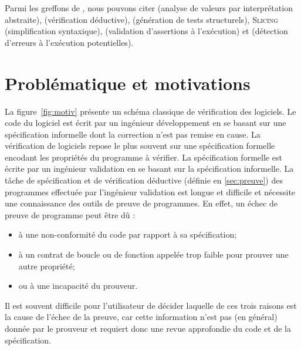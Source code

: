 Parmi les greffons de \framac, nous pouvons citer \Value (analyse de valeurs par
interprétation abstraite), \Wp (vérification déductive), \pathcrawler
(génération de tests structurels), \textsc{Slicing} (simplification syntaxique),
\eacsltoc (validation d'assertions à l'exécution) et \rte (détection
d'erreurs à l'exécution potentielles).


\section{Problématique et motivations}
\label{sec:pb-motiv}


La figure~\ref{fig:motiv} présente un schéma classique de vérification des
logiciels.
Le code du logiciel est écrit par un ingénieur développement en se basant sur
une spécification informelle dont la correction n'est pas remise en cause.
La vérification de logiciels repose le plus souvent sur une spécification
formelle encodant les propriétés du programme à vérifier.
La spécification formelle est écrite par un ingénieur validation en se basant
sur la spécification informelle.
La tâche de spécification et de vérification déductive (définie en
\ref{sec:preuve}) des programmes effectuée par l'ingénieur validation est longue
et difficile et nécessite une connaissance des outils de preuve de programmes.
En effet, un échec de preuve de programme peut être dû :
\begin{itemize}
\item à une non-conformité du code par rapport à sa spécification;
\item à un contrat de boucle ou de fonction appelée  trop faible pour prouver
  une autre propriété;
\item ou à une incapacité du prouveur.
\end{itemize}
Il est souvent difficile pour l'utilisateur de décider laquelle de ces trois
raisons est la cause de l'échec de la preuve, car cette information n'est pas
(en général) donnée par le prouveur et requiert donc une revue approfondie
du code et de la spécification.

